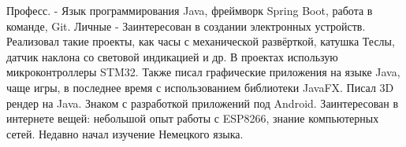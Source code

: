 \documentclass[]{cv-style}          %
\begin{document}
\begin{entrylist}
\entry
{Професс.}
{- {\normalfont
Язык программирования Java, фреймворк Spring Boot, работа в команде, Git. }}
{}
{}
\entry
{Личные}
{- {\normalfont 
Заинтересован в создании электронных устройств. Реализовал такие проекты, как часы с механической развёрткой, катушка Теслы, датчик наклона со световой индикацией и др. В проектах использую микроконтроллеры STM32. Также писал графические приложения на языке Java, чаще игры, в последнее время с использованием библиотеки JavaFX. Писал 3D рендер на Java. Знаком с разработкой приложений под Android. Заинтересован в интернете вещей: небольшой опыт работы с ESP8266, знание компьютерных сетей. Недавно начал изучение Немецкого языка.}}
{}
{}
\end{entrylist}
\end{document}
